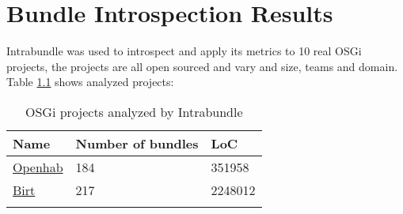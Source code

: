 \chapter{Bundle Introspection Results}

Intrabundle was used to introspect and apply its metrics to 10 real OSGi projects, the projects are all open sourced and vary and size, teams and domain. Table \ref{osgi-analyzed-projects} shows analyzed projects:

\begin{table}[h]
\caption{OSGi projects analyzed by Intrabundle}
\label{osgi-analyzed-projects}
\begin{center}
    \begin{tabular}{  p{5cm} | p{5cm} | p{4cm}}
    \Xhline{2\arrayrulewidth}
    Name & Number of bundles & LoC \\  \hline
    \href{http://www.openhab.org/}{Openhab} & 184 & 351958\\ \hline
   \href{http://eclipse.org/birt/}{Birt} & 217 & 2248012\\ 
   \Xhline{2\arrayrulewidth}

    \end{tabular}
\end{center}
\end{table}
\FloatBarrier 

